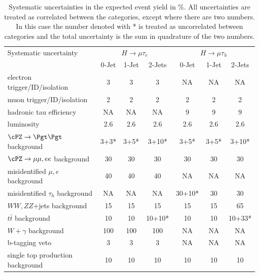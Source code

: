 \begin{table}[t]
 \centering
  \caption{Systematic uncertainties in the expected event yield in \%. All uncertainties are treated as correlated between the categories, except where there are two numbers. In
this case the number denoted with * is treated as uncorrelated between categories and the
total uncertainty is the sum in quadrature of the two numbers.}
  \label{tab:systematics}
{
\begin{tabular}{lccc|ccc} \hline
Systematic  uncertainty                                &  \multicolumn{3}{c|}{$H \rightarrow \mu \tau_{e}$}& \multicolumn{3}{c}{$H \rightarrow \mu \tau_{h}$}    \\ \cline{2-7}
                                                       &  0-Jet  & 1-Jet  & 2-Jets     &  0-Jet    & 1-Jet     & 2-Jets     \\ \hline
electron trigger/ID/isolation                          &   3   &   3  &   3     &    NA      &   NA       &  NA        \\
muon  trigger/ID/isolation                             &   2   &   2  &   2     &    2    &  2      &  2      \\
hadronic tau efficiency                                &   NA     &   NA    &   NA       &    9    &  9      &  9      \\
luminosity                                             &  2.6  &  2.6 &  2.6    &  2.6    &  2.6    &  2.6    \\
$\cPZ \rightarrow \Pgt \Pgt$ background                           &   3+3*&  3+5*&  3+10*  &   3+5*  &   3+5*  &   3+10* \\
$\cPZ \rightarrow \mu\mu,ee$ background                           &   30  &  30  &  30     &   30    &   30    &   30    \\
misidentified $\mu,e$  background                      &  40   &  40  &  40     &    NA      &   NA       &   NA       \\
misidentified $\tau_{h}$  background                           &  NA      &   NA    &    NA      &   30+10*&  30     &  30     \\
$WW,ZZ$+jets background                                 &  15   &  15  &   15    &  15     &  15     &  65     \\
$t\bar{t}$ background                         &  10  &  10 &  10+10* &  10    &  10    &  10+33* \\
$W +\gamma$ background                                 &  100  &  100 &  100   &     NA     &    NA      &    NA       \\
b-tagging veto                                         &    3  &   3  &   3     &    NA      &    NA      &    NA       \\
single top production background                       &  10   &  10  &  10    &  10    &  10    &   10    \\ \hline
  \end{tabular}
}

\end{table}


